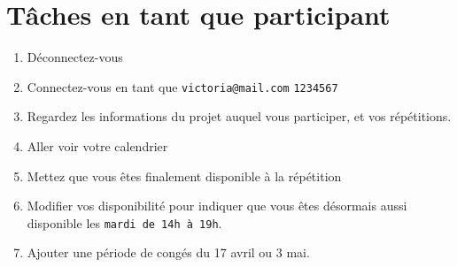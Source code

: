 \documentclass[11pt]{article}
\begin{document}
\section{Tâches en tant que participant}
\begin{enumerate}
    \item Déconnectez-vous
    \item Connectez-vous en tant que \texttt{victoria@mail.com} \texttt{1234567}
    \item Regardez les informations du projet auquel vous participer, et vos répétitions.
    \item Aller voir votre calendrier
    \item Mettez que vous êtes finalement disponible à la répétition \texttt{} %
    \item Modifier vos disponibilité pour indiquer que vous êtes désormais aussi disponible les \texttt{mardi de 14h à 19h}.
    \item Ajouter une période de congés du 17 avril ou 3 mai.
\end{enumerate}
\end{document}
